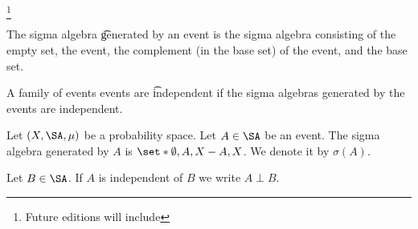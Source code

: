 
  \ifhmode\unskip\fi\footnote{
Future editions will include
  }


The sigma algebra \t{generated by an event} is the sigma algebra consisting of the empty set, the event, the complement (in the base set) of the event, and the base set.

A family of events events are \t{independent} if the sigma algebras generated by the events are independent.


Let $(X, \SA, \mu )$ be a probability space.
Let $A \in \SA$ be an event.
The sigma algebra generated by $A$ is $\set*{\emptyset, A, X - A, X}$.
We denote it by $\sigma (A)$.

Let $B \in \SA$.
If $A$ is independent of $B$ we write $A \perp B$.


